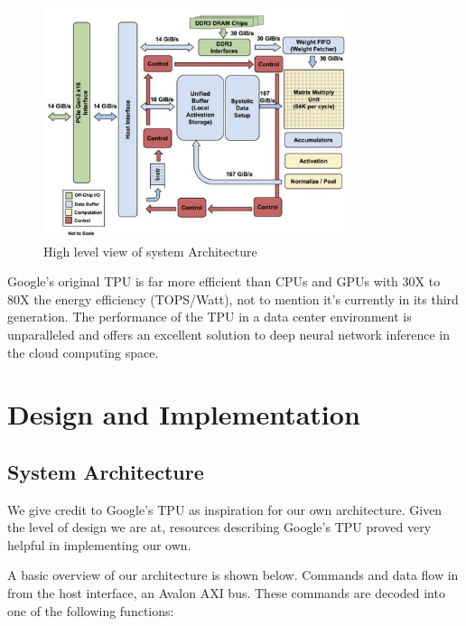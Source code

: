 \documentclass[11pt, conference, onecolumn]{IEEEtran}
\begin{document}
    \newpage

    \begin{figure}[htbp]
        \centering
        \includegraphics[width=9cm]{../figures/googleArchitecture.jpg}
        \caption{High level view of system Architecture}
    \end{figure}

    Google’s original TPU is far more efficient than CPUs and GPUs with 30X to
    80X the energy efficiency (TOPS/Watt), not to mention it’s currently in its third
    generation. The performance of the TPU in a data center environment is unparalleled
    and offers an excellent solution to deep neural network inference in the cloud computing
    space.


\section{Design and Implementation}

    \subsection{System Architecture}
        We give credit to Google's TPU as inspiration for our own architecture. Given the
        level of design we are at, resources describing Google's TPU proved very helpful
        in implementing our own.

        A basic overview of our architecture is shown below. Commands and data flow in
        from the host interface, an Avalon AXI bus. These commands are decoded into one of
        the following functions:
\end{document}
